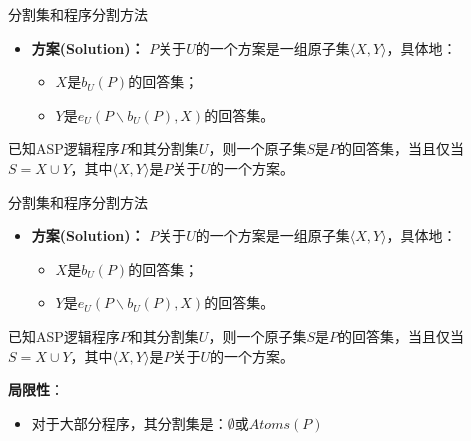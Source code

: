\documentclass{beamer}
\begin{document}
\begin{frame}[t]{分割集和程序分割方法}
	\begin{itemize}
		\item {\textbf{方案(Solution)：} $P$关于$U$的一个方案是一组原子集$\langle X,Y \rangle$，具体地：
			\begin{itemize}
				\item $X$是$b_U(P)$的回答集；
				\item $Y$是$e_U(P \backslash b_U(P), X)$的回答集。
			\end{itemize}
			}
	\end{itemize}
	
	
	\begin{theorem}[分割集理论]
		已知ASP逻辑程序$P$和其分割集$U$，则一个原子集$S$是$P$的回答集，当且仅当$S = X \cup Y$，其中$\langle X,Y \rangle$是$P$关于$U$的一个方案。
	\end{theorem}
	
\end{frame}


\begin{frame}[t]{分割集和程序分割方法}
	\begin{itemize}
		\item {\textbf{方案(Solution)：} $P$关于$U$的一个方案是一组原子集$\langle X,Y \rangle$，具体地：
			\begin{itemize}
				\item $X$是$b_U(P)$的回答集；
				\item $Y$是$e_U(P \backslash b_U(P), X)$的回答集。
			\end{itemize}
		}
	\end{itemize}
	
	
	\begin{theorem}[分割集理论]
		已知ASP逻辑程序$P$和其分割集$U$，则一个原子集$S$是$P$的回答集，当且仅当$S = X \cup Y$，其中$\langle X,Y \rangle$是$P$关于$U$的一个方案。
	\end{theorem}
	
	\vspace{0.5cm}
	
	\textbf{局限性}：
	\begin{itemize}
		\item 对于大部分程序，其分割集是：$\emptyset$或$Atoms(P)$
	\end{itemize}
	
\end{frame}


\end{document}
